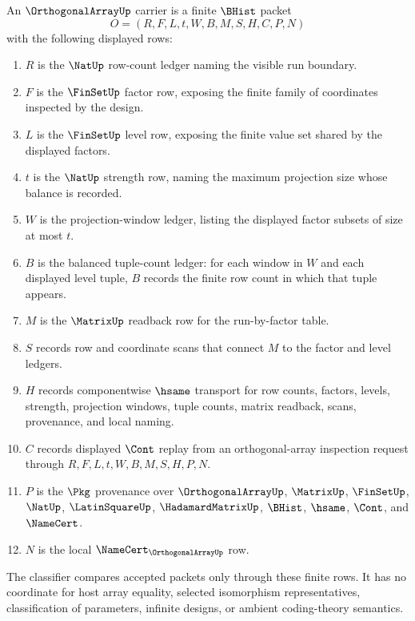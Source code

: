 \begin{definition}
\label{def:orthogonal-array-carrier}
An $\OrthogonalArrayUp$ carrier is a finite $\BHist$ packet
$$
O=(R,F,L,t,W,B,M,S,H,C,P,N)
$$
with the following displayed rows:
\begin{enumerate}
\item $R$ is the $\NatUp$ row-count ledger naming the visible run boundary.
\item $F$ is the $\FinSetUp$ factor row, exposing the finite family of coordinates inspected by the design.
\item $L$ is the $\FinSetUp$ level row, exposing the finite value set shared by the displayed factors.
\item $t$ is the $\NatUp$ strength row, naming the maximum projection size whose balance is recorded.
\item $W$ is the projection-window ledger, listing the displayed factor subsets of size at most $t$.
\item $B$ is the balanced tuple-count ledger: for each window in $W$ and each displayed level tuple, $B$ records the finite row count in which that tuple appears.
\item $M$ is the $\MatrixUp$ readback row for the run-by-factor table.
\item $S$ records row and coordinate scans that connect $M$ to the factor and level ledgers.
\item $H$ records componentwise $\hsame$ transport for row counts, factors, levels, strength, projection windows, tuple counts, matrix readback, scans, provenance, and local naming.
\item $C$ records displayed $\Cont$ replay from an orthogonal-array inspection request through $R,F,L,t,W,B,M,S,H,P,N$.
\item $P$ is the $\Pkg$ provenance over $\OrthogonalArrayUp$, $\MatrixUp$, $\FinSetUp$, $\NatUp$, $\LatinSquareUp$, $\HadamardMatrixUp$, $\BHist$, $\hsame$, $\Cont$, and $\NameCert$.
\item $N$ is the local $\NameCert_{\OrthogonalArrayUp}$ row.
\end{enumerate}
The classifier compares accepted packets only through these finite rows. It has no coordinate for host array equality, selected isomorphism representatives, classification of parameters, infinite designs, or ambient coding-theory semantics.
\end{definition}

